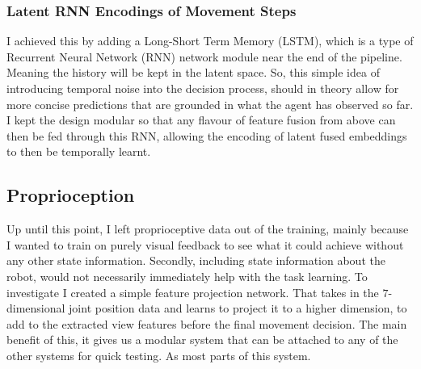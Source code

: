 \subsubsection{Latent RNN Encodings of Movement Steps}
I achieved this by adding a Long-Short Term Memory (LSTM), which is a type of Recurrent Neural Network (RNN)  network module near the end of the pipeline. Meaning the history will be kept in the latent space. So, this simple idea of introducing temporal noise into the decision process, should in theory allow for more concise predictions that are grounded in what the agent has observed so far. I kept the design modular so that any flavour of feature fusion from above can then be fed through this RNN, allowing the encoding of latent fused embeddings to then be temporally learnt.



\subsection{Proprioception}
Up until this point, I left proprioceptive data out of the training, mainly because I wanted to train on purely visual feedback to see what it could achieve without any other state information. Secondly, including state information about the robot, would not necessarily immediately help with the task learning. To investigate I created a simple feature projection network. That takes in the $7$-dimensional joint position data and learns to project it to a higher dimension, to add to the extracted view features before the final movement decision. The main benefit of this, it gives us a modular system that can be attached to any of the other systems for quick testing. As most parts of this system.

